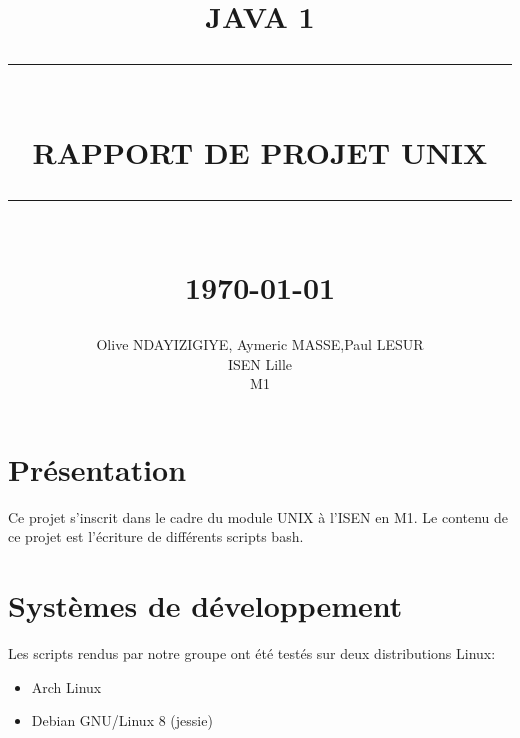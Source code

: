 \documentclass[12pt]{report}
\newcommand{\HRule}[1]{\rule{\linewidth}{#1}}
\begin{document}
\title{ \normalsize \textsc{JAVA 1}
        \\ [2.0cm]
        \HRule{0.5pt} \\
        \LARGE \textbf{\uppercase{Rapport de projet UNIX}}
        \HRule{2pt} \\ [0.5cm]
        \normalsize \today \vspace*{5\baselineskip}}

\date{}

\author{
        Olive NDAYIZIGIYE, Aymeric MASSE,Paul LESUR\\ 
        ISEN Lille\\
        M1}

\maketitle
\tableofcontents
\newpage

\sectionfont{\scshape}


\section*{Présentation}

Ce projet s'inscrit dans le cadre du module UNIX à l'ISEN en M1. Le contenu de ce projet est l'écriture de différents scripts bash.




\newpage
\section*{Systèmes de développement}

Les scripts rendus par notre groupe ont été testés sur deux distributions Linux:


\begin{itemize}
\item Arch Linux
\item Debian GNU/Linux 8 (jessie)
\end{itemize}
\end{document}
